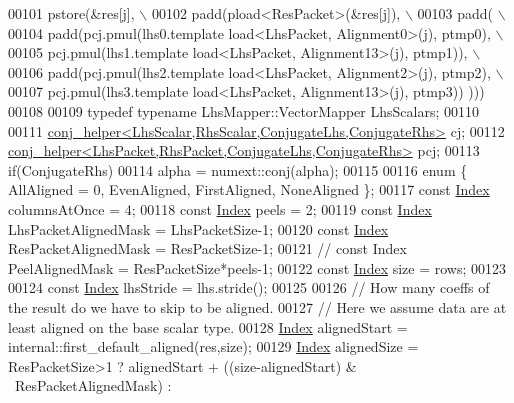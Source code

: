 \begin{DoxyCode}
00101 \textcolor{preprocessor}{    pstore(&res[j], \(\backslash\)}
00102 \textcolor{preprocessor}{      padd(pload<ResPacket>(&res[j]), \(\backslash\)}
00103 \textcolor{preprocessor}{        padd( \(\backslash\)}
00104 \textcolor{preprocessor}{      padd(pcj.pmul(lhs0.template load<LhsPacket, Alignment0>(j),    ptmp0), \(\backslash\)}
00105 \textcolor{preprocessor}{      pcj.pmul(lhs1.template load<LhsPacket, Alignment13>(j),   ptmp1)),   \(\backslash\)}
00106 \textcolor{preprocessor}{      padd(pcj.pmul(lhs2.template load<LhsPacket, Alignment2>(j),    ptmp2), \(\backslash\)}
00107 \textcolor{preprocessor}{      pcj.pmul(lhs3.template load<LhsPacket, Alignment13>(j),   ptmp3)) )))}
00108 
00109   \textcolor{keyword}{typedef} \textcolor{keyword}{typename} LhsMapper::VectorMapper LhsScalars;
00110 
00111   \hyperlink{struct_eigen_1_1internal_1_1conj__helper}{conj\_helper<LhsScalar,RhsScalar,ConjugateLhs,ConjugateRhs>}
       cj;
00112   \hyperlink{struct_eigen_1_1internal_1_1conj__helper}{conj\_helper<LhsPacket,RhsPacket,ConjugateLhs,ConjugateRhs>}
       pcj;
00113   \textcolor{keywordflow}{if}(ConjugateRhs)
00114     alpha = numext::conj(alpha);
00115 
00116   \textcolor{keyword}{enum} \{ AllAligned = 0, EvenAligned, FirstAligned, NoneAligned \};
00117   \textcolor{keyword}{const} \hyperlink{namespace_eigen_a62e77e0933482dafde8fe197d9a2cfde}{Index} columnsAtOnce = 4;
00118   \textcolor{keyword}{const} \hyperlink{namespace_eigen_a62e77e0933482dafde8fe197d9a2cfde}{Index} peels = 2;
00119   \textcolor{keyword}{const} \hyperlink{namespace_eigen_a62e77e0933482dafde8fe197d9a2cfde}{Index} LhsPacketAlignedMask = LhsPacketSize-1;
00120   \textcolor{keyword}{const} \hyperlink{namespace_eigen_a62e77e0933482dafde8fe197d9a2cfde}{Index} ResPacketAlignedMask = ResPacketSize-1;
00121 \textcolor{comment}{//  const Index PeelAlignedMask = ResPacketSize*peels-1;}
00122   \textcolor{keyword}{const} \hyperlink{namespace_eigen_a62e77e0933482dafde8fe197d9a2cfde}{Index} size = rows;
00123 
00124   \textcolor{keyword}{const} \hyperlink{namespace_eigen_a62e77e0933482dafde8fe197d9a2cfde}{Index} lhsStride = lhs.stride();
00125 
00126   \textcolor{comment}{// How many coeffs of the result do we have to skip to be aligned.}
00127   \textcolor{comment}{// Here we assume data are at least aligned on the base scalar type.}
00128   \hyperlink{namespace_eigen_a62e77e0933482dafde8fe197d9a2cfde}{Index} alignedStart = internal::first\_default\_aligned(res,size);
00129   \hyperlink{namespace_eigen_a62e77e0933482dafde8fe197d9a2cfde}{Index} alignedSize = ResPacketSize>1 ? alignedStart + ((size-alignedStart) & ~ResPacketAlignedMask) :

\end{DoxyCode}
